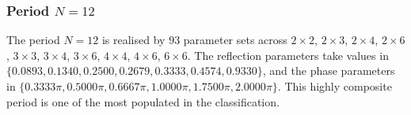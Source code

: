 \par
\subsubsection{Period $N = 12$}
The period $N=12$ is realised by $93$ parameter sets across $2\times2$, $2\times3$, $2\times4$, $2\times6$, $3\times3$, $3\times4$, $3\times6$, $4\times4$, $4\times6$, $6\times6$. The reflection parameters take values in $\{0.0893, 0.1340, 0.2500, 0.2679, 0.3333, 0.4574, 0.9330\}$, and the phase parameters in $\{0.3333\pi, 0.5000\pi, 0.6667\pi, 1.0000\pi, 1.7500\pi, 2.0000\pi\}$. This highly composite period is one of the most populated
in the classification.
